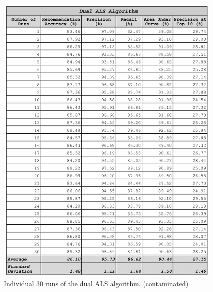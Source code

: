 \begin{appendices}
\begin{figure}
\centering
\includegraphics[scale=0.3]{appendices/dual_als_30_runs.png}
\caption{Individual 30 runs of the dual ALS algorithm. (contaminated)}
\label{fig:dual_algorithm}
\end{figure}


\end{appendices}
